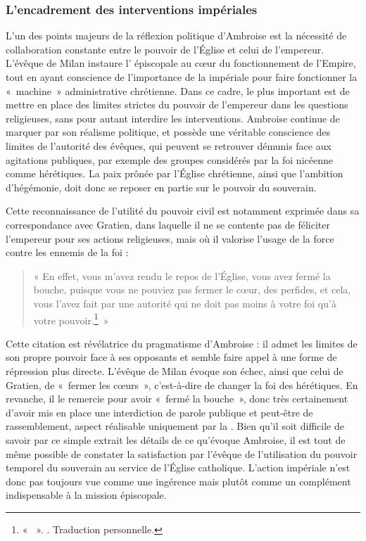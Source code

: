 \bigskip

\subsubsection{L'encadrement des interventions impériales}

L'un des points majeurs de la réflexion politique d'Ambroise est la nécessité de collaboration constante entre le pouvoir de l'Église et celui de l'empereur. L'évêque de Milan instaure l' épiscopale au cœur du fonctionnement de l'Empire, tout en ayant conscience de l'importance de la  impériale pour faire fonctionner la «~machine~» administrative chrétienne. Dans ce cadre, le plus important est de mettre en place des limites strictes du pouvoir de l'empereur dans les questions religieuses, sans pour autant interdire les interventions. Ambroise continue de marquer par son réalisme politique, et possède une véritable conscience des limites de l'autorité des évêques, qui peuvent se retrouver démunis face aux agitations publiques, par exemple des groupes considérés par la foi nicéenne comme hérétiques. La paix prônée par l'Église chrétienne, ainsi que l'ambition d'hégémonie, doit donc se reposer en partie sur le pouvoir du souverain.

\bigskip

Cette reconnaissance de l'utilité du pouvoir civil est notamment exprimée dans sa correspondance avec Gratien, dans laquelle il ne se contente pas de féliciter l'empereur pour ses actions religieuses, mais où il valorise l'usage de la force contre les ennemis de la foi :

\bigskip

\begin{quote}
    « En effet, vous m'avez rendu le repos de l'Église, vous avez fermé la bouche, puisque vous ne pouviez pas fermer le cœur, des perfides, et cela, vous l'avez fait par une autorité qui ne doit pas moins à votre foi qu'à votre pouvoir.\footnote{« ~». \cite[\nopp ec. 12, 2]{ambroise_csel_82_3}. Traduction personnelle.}~»
\end{quote}

\bigskip

Cette citation est révélatrice du pragmatisme d'Ambroise : il admet les limites de son propre pouvoir face à ses opposants et semble faire appel à une forme de répression plus directe. L'évêque de Milan évoque son échec, ainsi que celui de Gratien, de «~fermer les cœurs~», c'est-à-dire de changer la foi des hérétiques. En revanche, il le remercie pour avoir «~fermé la bouche~», donc très certainement d'avoir mis en place une interdiction de parole publique et peut-être de rassemblement, aspect réalisable uniquement par la . Bien qu'il soit difficile de savoir par ce simple extrait les détails de ce qu'évoque Ambroise, il est tout de même possible de constater la satisfaction par l'évêque de l'utilisation du pouvoir temporel du souverain au service de l'Église catholique. L'action impériale n'est donc pas toujours vue comme une ingérence mais plutôt comme un complément indispensable à la mission épiscopale.

